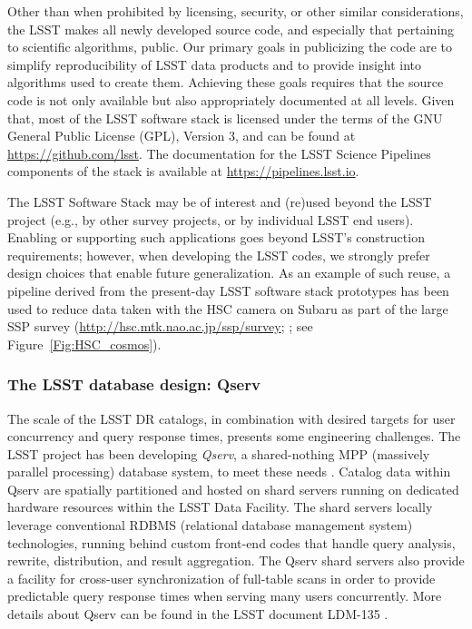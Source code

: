 Other than when prohibited by licensing, security, or other similar
considerations, the LSST makes all newly developed source code, and especially
that pertaining to scientific algorithms, public.  Our primary goals in
publicizing the code are to simplify reproducibility of LSST data products
and to provide insight into algorithms used to create them.  Achieving these goals requires
that the source code is not only available but also appropriately documented at all
levels.
Given that, most of the LSST software stack is licensed under the terms of the GNU General
Public License (GPL), Version 3, and can be found at \url{https://github.com/lsst}.
The documentation for the LSST Science Pipelines components of the stack is available at
\url{https://pipelines.lsst.io}.

The LSST Software Stack may be of interest and (re)used beyond the LSST project (e.g.,
by other survey projects, or by individual LSST end users).  Enabling
or supporting such applications goes beyond LSST’s construction
requirements; however, when developing the LSST codes, we strongly
prefer design choices that enable future generalization.  As an example of such
reuse, a pipeline derived from the present-day LSST software stack prototypes
has been used to reduce data taken with the HSC camera \citep{2018PASJ...70S...1M} on
Subaru as part of the large SSP survey (\url{http://hsc.mtk.nao.ac.jp/ssp/survey};
\citet{2018PASJ...70S...4A,2018PASJ...70S...5B}; see Figure~\ref{Fig:HSC_cosmos}).



\subsubsection{The LSST database design: Qserv}
\label{sec:Qserv}

The scale of the LSST DR catalogs, in combination with desired targets for user concurrency
and query response times, presents some engineering challenges. The LSST project has been developing
\emph{Qserv}, a shared-nothing MPP (massively parallel processing) database system, to meet these needs
\citep{Wang:2011:QDS:2063348.2063364}.
Catalog data within Qserv are spatially partitioned and hosted on shard servers running on dedicated hardware
resources within the LSST Data Facility.  The shard servers locally leverage conventional RDBMS (relational
database management system) technologies, running behind custom front-end codes that handle query
analysis, rewrite, distribution, and result aggregation.  The Qserv shard servers also provide a facility for
cross-user synchronization of full-table scans in order to provide predictable query response times when
serving many users concurrently. More details about Qserv can be found in
the LSST document LDM-135 \citep{LDM-135}.


